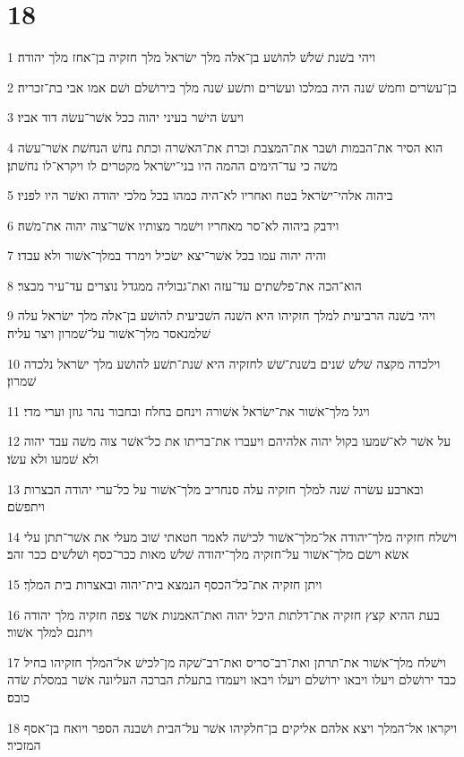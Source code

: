 \chapter{18}

\par 1 ויהי בשׁנת שׁלשׁ להושׁע בן־אלה מלך ישׂראל מלך חזקיה בן־אחז מלך יהודה׃
\par 2 בן־עשׂרים וחמשׁ שׁנה היה במלכו ועשׂרים ותשׁע שׁנה מלך בירושׁלם ושׁם אמו אבי בת־זכריה׃
\par 3 ויעשׂ הישׁר בעיני יהוה ככל אשׁר־עשׂה דוד אביו׃
\par 4 הוא הסיר את־הבמות ושׁבר את־המצבת וכרת את־האשׁרה וכתת נחשׁ הנחשׁת אשׁר־עשׂה משׁה כי עד־הימים ההמה היו בני־ישׂראל מקטרים לו ויקרא־לו נחשׁתן׃
\par 5 ביהוה אלהי־ישׂראל בטח ואחריו לא־היה כמהו בכל מלכי יהודה ואשׁר היו לפניו׃
\par 6 וידבק ביהוה לא־סר מאחריו וישׁמר מצותיו אשׁר־צוה יהוה את־משׁה׃
\par 7 והיה יהוה עמו בכל אשׁר־יצא ישׂכיל וימרד במלך־אשׁור ולא עבדו׃
\par 8 הוא־הכה את־פלשׁתים עד־עזה ואת־גבוליה ממגדל נוצרים עד־עיר מבצר׃
\par 9 ויהי בשׁנה הרביעית למלך חזקיהו היא השׁנה השׁביעית להושׁע בן־אלה מלך ישׂראל עלה שׁלמנאסר מלך־אשׁור על־שׁמרון ויצר עליה׃
\par 10 וילכדה מקצה שׁלשׁ שׁנים בשׁנת־שׁשׁ לחזקיה היא שׁנת־תשׁע להושׁע מלך ישׂראל נלכדה שׁמרון׃
\par 11 ויגל מלך־אשׁור את־ישׂראל אשׁורה וינחם בחלח ובחבור נהר גוזן וערי מדי׃
\par 12 על אשׁר לא־שׁמעו בקול יהוה אלהיהם ויעברו את־בריתו את כל־אשׁר צוה משׁה עבד יהוה ולא שׁמעו ולא עשׂו׃
\par 13 ובארבע עשׂרה שׁנה למלך חזקיה עלה סנחריב מלך־אשׁור על כל־ערי יהודה הבצרות ויתפשׂם׃
\par 14 וישׁלח חזקיה מלך־יהודה אל־מלך־אשׁור לכישׁה לאמר חטאתי שׁוב מעלי את אשׁר־תתן עלי אשׂא וישׂם מלך־אשׁור על־חזקיה מלך־יהודה שׁלשׁ מאות ככר־כסף ושׁלשׁים ככר זהב׃
\par 15 ויתן חזקיה את־כל־הכסף הנמצא בית־יהוה ובאצרות בית המלך׃
\par 16 בעת ההיא קצץ חזקיה את־דלתות היכל יהוה ואת־האמנות אשׁר צפה חזקיה מלך יהודה ויתנם למלך אשׁור׃
\par 17 וישׁלח מלך־אשׁור את־תרתן ואת־רב־סריס ואת־רב־שׁקה מן־לכישׁ אל־המלך חזקיהו בחיל כבד ירושׁלם ויעלו ויבאו ירושׁלם ויעלו ויבאו ויעמדו בתעלת הברכה העליונה אשׁר במסלת שׂדה כובס׃
\par 18 ויקראו אל־המלך ויצא אלהם אליקים בן־חלקיהו אשׁר על־הבית ושׁבנה הספר ויואח בן־אסף המזכיר׃
